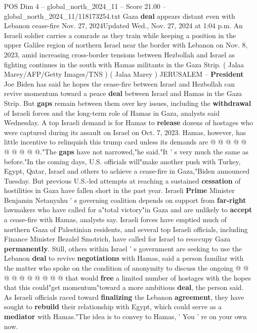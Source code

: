 \begin{textsample}{POS Dim 4 – global\_north\_2024\_11 – Score 21.00 – global\_north\_2024\_11/118173254.txt}  \label{ex:f4_pos_284}
Gaza \textbf{deal} appears distant even with Lebanon cease-fire Nov. 27, 2024Updated Wed., Nov. 27, 2024 at 1:04 p.m.
An Israeli soldier carries a comrade as they train while keeping a position in the upper Galilee region of northern Israel near the border with Lebanon on Nov. 8, 2023, amid increasing cross-border tensions between Hezbollah and Israel as fighting continues in the south with Hamas militants in the Gaza Strip. ( Jalaa Marey/AFP/Getty Images/TNS ) ( Jalaa Marey ) JERUSALEM -- \textbf{President} Joe Biden has said he hopes the cease-fire between Israel and Hezbollah can revive momentum toward a peace \textbf{deal} between Israel and Hamas in the Gaza Strip.
But \textbf{gaps} remain between them over key issues, including the \textbf{withdrawal} of Israeli forces and the long-term role of Hamas in Gaza, analysts said Wednesday.
A top Israeli demand is for Hamas to \textbf{release} dozens of hostages who were captured during its assault on Israel on Oct. 7, 2023.
Hamas, however, has little incentive to relinquish this trump card unless its demands are @ @ @ @ @ @ @ @ @ @."The \textbf{gaps} have not narrowed,"he said."It ' s very much the same as before."In the coming days, U.S. officials will"make another push with Turkey, Egypt, Qatar, Israel and others to achieve a cease-fire in Gaza,"Biden announced Tuesday.
But previous U.S.-led attempts at reaching a sustained \textbf{cessation} of hostilities in Gaza have fallen short in the past year.
Israeli \textbf{Prime} Minister Benjamin Netanyahu ' s governing coalition depends on support from \textbf{far-right} lawmakers who have called for a"total victory"in Gaza and are unlikely to \textbf{accept} a cease-fire with Hamas, analysts say.
Israeli forces have emptied much of northern Gaza of Palestinian residents, and several top Israeli officials, including Finance Minister Bezalel Smotrich, have called for Israel to reoccupy Gaza \textbf{permanently}.
Still, others within Israel ' s government are seeking to use the Lebanon \textbf{deal} to revive \textbf{negotiations} with Hamas, said a person familiar with the matter who spoke on the condition of anonymity to discuss the ongoing @ @ @ @ @ @ @ @ @ @ that would \textbf{free} a limited number of hostages with the hopes that this could"get momentum"toward a more ambitious \textbf{deal}, the person said.
As Israeli officials raced toward \textbf{finalizing} the Lebanon \textbf{agreement}, they have sought to \textbf{rebuild} their relationship with Egypt, which could serve as a \textbf{mediator} with Hamas."The idea is to convey to Hamas, ' You ' re on your own now.

\end{textsample}
